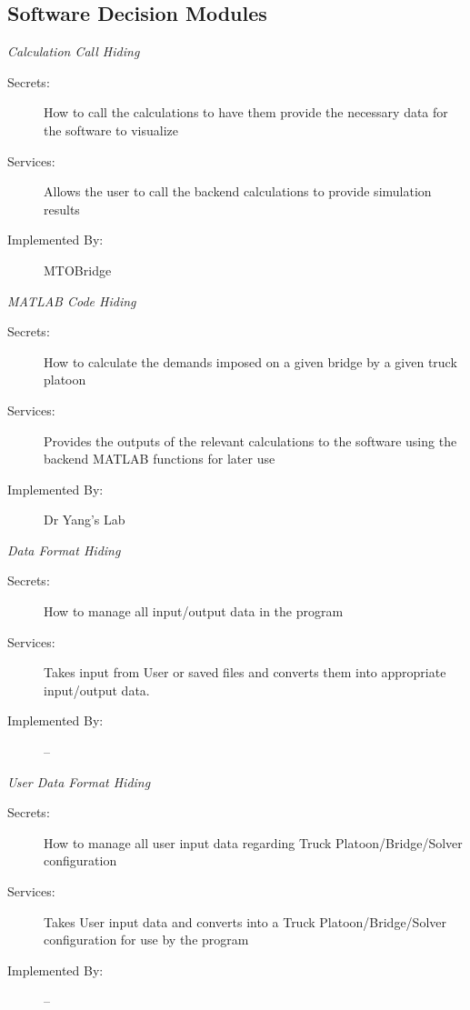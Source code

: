\documentclass[12pt, titlepage]{article}
\begin{document}
\subsection{Software Decision Modules}
    \hypertarget{CCH}{\emph{{\large Calculation Call Hiding}}}
    \begin{description}
        \item[Secrets:] How to call the calculations to have them provide the necessary data for the software to visualize
        \item[Services:] Allows the user to call the backend calculations to provide simulation results
        \item[Implemented By:] MTOBridge\\
    \end{description}
     \hypertarget{MCH}{\emph{{\large MATLAB Code Hiding}}}
    \begin{description}
        \item[Secrets:] How to calculate the demands imposed on a given bridge by a given truck platoon
        \item[Services:] Provides the outputs of the relevant calculations to the software using the backend MATLAB functions for later use
        \item[Implemented By:] Dr Yang's Lab\\
    \end{description}
     \hypertarget{DFH}{\emph{{\large Data Format Hiding}}}
    \begin{description}
        \item[Secrets:]How to manage all input/output data in the program
        \item[Services:]Takes input from User or saved files and converts them into appropriate input/output data.
        \item[Implemented By:] --\\
    \end{description}
    \emph{{\large User Data Format Hiding}}
    \begin{description}
        \item[Secrets:]How to manage all user input data regarding Truck Platoon/Bridge/Solver configuration
        \item[Services:]Takes User input data and converts into a Truck Platoon/Bridge/Solver configuration for use by the program
        \item[Implemented By:] --\\
    \end{description}
\end{document}

